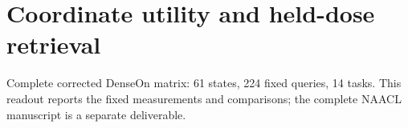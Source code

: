 \documentclass[11pt]{article}
\begin{document}
\section*{Coordinate utility and held-dose retrieval}
Complete corrected DenseOn matrix: 61 states, 224 fixed queries, 14 tasks.
This readout reports the fixed measurements and comparisons; the complete
NAACL manuscript is a separate deliverable.

\DimensionUtilizationFinding

\DimensionRetrievalBridgeFinding

\DimensionConclusionFinding
\DimensionUtilizationFigure
\DimensionUtilizationAppendixTable
\end{document}
